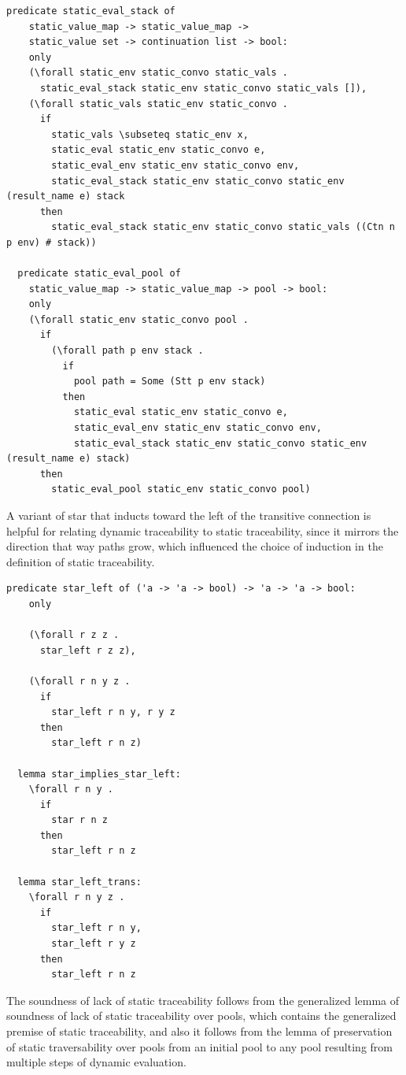 \documentclass[10pt]{article}
\begin{document}
\begin{lstlisting}[language=logic, mathescape]
  predicate static_eval_stack of
    static_value_map -> static_value_map ->
    static_value set -> continuation list -> bool:
    only 
    (\forall static_env static_convo static_vals .
      static_eval_stack static_env static_convo static_vals []),
    (\forall static_vals static_env static_convo . 
      if 
        static_vals \subseteq static_env x,
        static_eval static_env static_convo e,
        static_eval_env static_env static_convo env,
        static_eval_stack static_env static_convo static_env (result_name e) stack 
      then
        static_eval_stack static_env static_convo static_vals ((Ctn n p env) # stack))

  predicate static_eval_pool of
    static_value_map -> static_value_map -> pool -> bool:
    only
    (\forall static_env static_convo pool .
      if
        (\forall path p env stack .
          if
            pool path = Some (Stt p env stack)
          then 
            static_eval static_env static_convo e,
            static_eval_env static_env static_convo env,
            static_eval_stack static_env static_convo static_env (result_name e) stack)
      then 
        static_eval_pool static_env static_convo pool)
  \end{lstlisting}


A variant of star that inducts toward the left of the transitive connection is helpful for
relating dynamic traceability to static traceability, since it mirrors the direction that way
paths grow, which influenced the choice of induction in the definition of static
traceability.

\begin{lstlisting}[language=logic, mathescape]
  predicate star_left of ('a -> 'a -> bool) -> 'a -> 'a -> bool:
    only

    (\forall r z z .
      star_left r z z),

    (\forall r n y z .
      if
        star_left r n y, r y z
      then
        star_left r n z)

  lemma star_implies_star_left:
    \forall r n y .
      if
        star r n z
      then
        star_left r n z

  lemma star_left_trans:
    \forall r n y z .
      if 
        star_left r n y,
        star_left r y z 
      then
        star_left r n z
\end{lstlisting}

The soundness of lack of static traceability follows from the generalized lemma
of soundness of lack of static traceability over pools, which contains
the generalized premise of
static traceability, and also it follows from the lemma of preservation of static
traversability over pools from an initial pool to any pool resulting from multiple steps of
dynamic evaluation.
\end{document}

